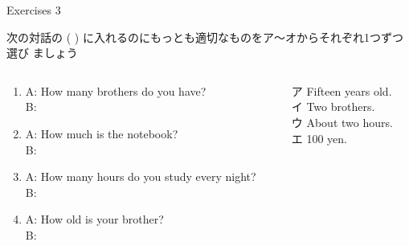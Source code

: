 \documentclass[aspectratio=169,xcolor={dvipsnames,table}]{beamer}
\begin{document}
\begin{frame}[plain]{Exercises 3}
 
 次の対話の ( ) に入れるのにもっとも適切なものをア～オからそれぞれ1つずつ選び
ましょう
\begin{columns}
\begin{column}{.65\textwidth}
\begin{enumerate}
 \item A: How many brothers do you have?\\
B: 
\item A: How much is the notebook? \\
B:   
 \item  A: How many hours do you study every night?\\ 
B:   
  \item A: How old is your brother?\\
B:  
\end{enumerate} 
\end{column}
\begin{column}{.35\textwidth}
\begin{tcolorbox}
 
ア Fifteen years old.\\
イ Two brothers.\\
ウ About two hours.\\
エ 100 yen.
\end{tcolorbox}

\end{column}
\end{columns}

\end{frame}
\end{document}
